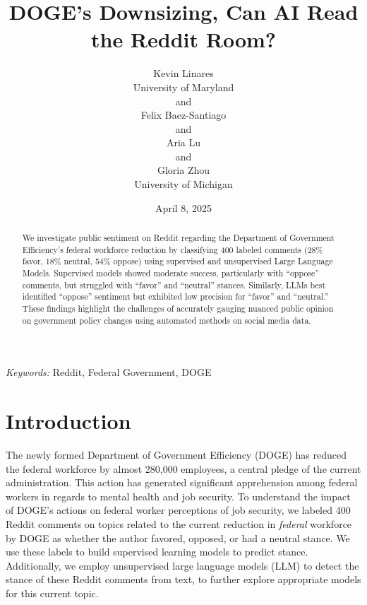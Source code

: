\documentclass[
  12pt]{article}
\begin{document}
\def\spacingset#1{\renewcommand{\baselinestretch}%
{#1}\small\normalsize} \spacingset{1}



\date{April 8, 2025}
\title{\bf DOGE's Downsizing, Can AI Read the Reddit Room?}
\author{
Kevin Linares\\
University of Maryland\\
and\\Felix Baez-Santiago\\
and\\Aria Lu\\
and\\Gloria Zhou\\
University of Michigan\\
}
\maketitle

\bigskip
\bigskip
\begin{abstract}
We investigate public sentiment on Reddit regarding the Department of
Government Efficiency's federal workforce reduction by classifying 400
labeled comments (28\% favor, 18\% neutral, 54\% oppose) using
supervised and unsupervised Large Language Models. Supervised models
showed moderate success, particularly with ``oppose'' comments, but
struggled with ``favor'' and ``neutral'' stances. Similarly, LLMs best
identified ``oppose'' sentiment but exhibited low precision for
``favor'' and ``neutral.'' These findings highlight the challenges of
accurately gauging nuanced public opinion on government policy changes
using automated methods on social media data.
\end{abstract}

\noindent%
{\it Keywords:} Reddit, Federal Government, DOGE
\vfill

\newpage
\spacingset{1.9} %


\section{Introduction}\label{sec-intro}

The newly formed Department of Government Efficiency (DOGE) has reduced
the federal workforce by almost 280,000 employees, a central pledge of
the current administration. This action has generated significant
apprehension among federal workers in regards to mental health and job
security. To understand the impact of DOGE's actions on federal worker
perceptions of job security, we labeled 400 Reddit comments on topics
related to the current reduction in \emph{federal} workforce by DOGE as
whether the author favored, opposed, or had a neutral stance. We use
these labels to build supervised learning models to predict stance.
Additionally, we employ unsupervised large language models (LLM) to
detect the stance of these Reddit comments from text, to further explore
appropriate models for this current topic.
\end{document}
